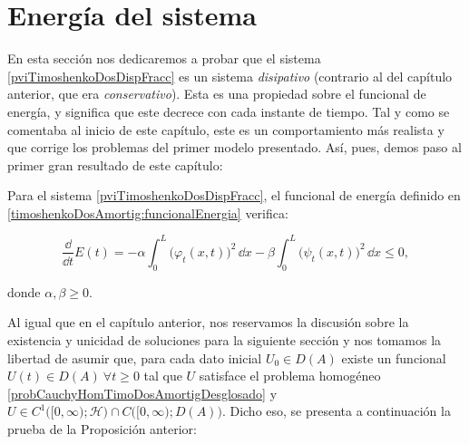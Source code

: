 \section{Energía del sistema}
\label{ch:TimoshenkoFric:section:energia}

En esta sección nos dedicaremos a probar que el sistema \eqref{pviTimoshenkoDosDispFracc} es un sistema \textit{disipativo} (contrario al del capítulo anterior, que era \textit{conservativo}). Esta es una propiedad sobre el funcional de energía, y significa que este decrece con cada instante de tiempo. Tal y como se comentaba al inicio de este capítulo, este es un comportamiento más realista y que corrige los problemas del primer modelo presentado. Así, pues, demos paso al primer gran resultado de este capítulo:\\

\begin{Proposicion}
\label{ch:timoshenkoFric:prop:DisipacionEnergia}

    Para el sistema \eqref{pviTimoshenkoDosDispFracc}, el funcional de energía definido en \eqref{timoshenkoDosAmortig:funcionalEnergia} verifica:

    \[\frac{\dd}{\dd t}E(t) = -\alpha\int_0^L \big(\varphi_t(x, t)\big)^2 \, \dd x -\beta\int_0^L \big(\psi_t(x, t)\big)^2 \, \dd x \leq 0,\]

    donde $\alpha, \beta \geq 0$.
\end{Proposicion}

Al igual que en el capítulo anterior, nos reservamos la discusión sobre la existencia y unicidad de soluciones para la siguiente sección y nos tomamos la libertad de asumir que, para cada dato inicial $U_0 \in D(A)$ existe un funcional $U(t) \in D(A) \ \forall t \geq 0$ tal que $U$ satisface el problema homogéneo \eqref{probCauchyHomTimoDosAmortigDesglosado} y $U \in C^1\big([0,\infty);\mathcal{H}\big) \cap C\big([0,\infty);D(A)\big)$. Dicho eso, se presenta a continuación la prueba de la Proposición anterior:

